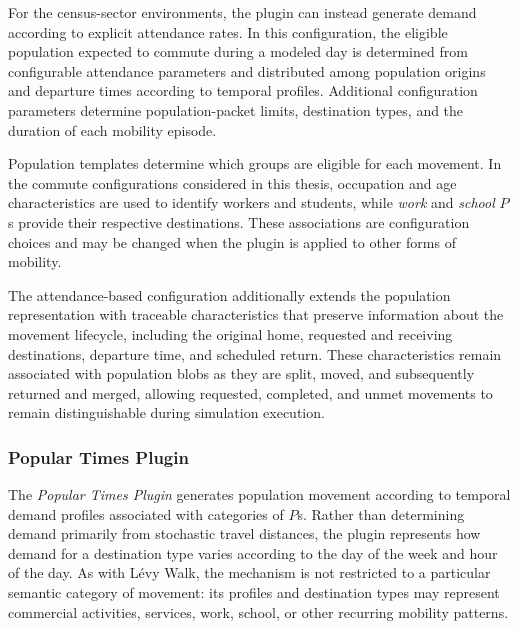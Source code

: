For the census-sector environments, the plugin can instead generate demand according to explicit attendance rates. In this configuration, the eligible population expected to commute during a modeled day is determined from configurable attendance parameters and distributed among population origins and departure times according to temporal profiles. Additional configuration parameters determine population-packet limits, destination types, and the duration of each mobility episode.

Population templates determine which groups are eligible for each movement. In the commute configurations considered in this thesis, occupation and age characteristics are used to identify workers and students, while \textit{work} and \textit{school} $P$s provide their respective destinations. These associations are configuration choices and may be changed when the plugin is applied to other forms of mobility.

The attendance-based configuration additionally extends the population representation with traceable characteristics that preserve information about the movement lifecycle, including the original home, requested and receiving destinations, departure time, and scheduled return. These characteristics remain associated with population blobs as they are split, moved, and subsequently returned and merged, allowing requested, completed, and unmet movements to remain distinguishable during simulation execution.


\subsubsection{Popular Times Plugin}
\label{sec:popular_times_plugin_inputs}

The \textit{Popular Times Plugin} generates population movement according to temporal demand profiles associated with categories of $P$s. Rather than determining demand primarily from stochastic travel distances, the plugin represents how demand for a destination type varies according to the day of the week and hour of the day. As with L\'evy Walk, the mechanism is not restricted to a particular semantic category of movement: its profiles and destination types may represent commercial activities, services, work, school, or other recurring mobility patterns.

